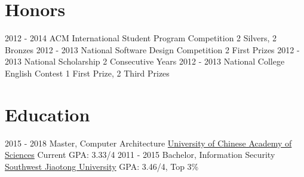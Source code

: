 \documentclass[letterpaper]{twentysecondcv} %
\begin{document}
\section{Honors}
\begin{twenty}
	\twentyitemthree
	{2012 - 2014}
	{ACM International Student Program Competition}
	{2 Silvers, 2 Bronzes}
	\twentyitemthree
	{2012 - 2013}
	{National Software Design Competition}
	{2 First Prizes}
	\twentyitemthree
	{2012 - 2013}
	{National Scholarship}
	{2 Consecutive Years}
	\twentyitemthree
	{2012 - 2013}
	{National College English Contest}
	{1 First Prize, 2 Third Prizes}
\end{twenty}


\section{Education}

\begin{twenty} %
	\twentyitem
	{2015 - 2018}
	{Master, Computer Architecture}
	{\href{http://english.cas.cn/}{University of Chinese Academy of Sciences}}
	{}
	{Current GPA: 3.33/4}
	\twentyitem
	{2011 - 2015}
	{Bachelor, Information Security}
	{\href{http://english.swjtu.edu.cn/}{Southwest Jiaotong University}}
	{}
	{GPA: 3.46/4, Top 3\%}
\end{twenty}
\end{document}
